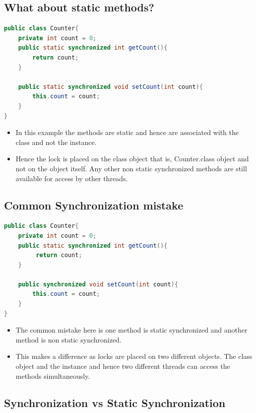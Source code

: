 \documentclass[12pt, a4paper]{book}
\begin{document}
\subsection{What about static methods?}
\begin{lstlisting}[language=java]
public class Counter{
	private int count = 0;
	public static synchronized int getCount(){
	    return count;
	}

	public static synchronized void setCount(int count){
	    this.count = count;
	}
}
\end{lstlisting}
\begin{itemize}
    \item In this example the methods are static and hence are associated with the class and not the instance.
    \item Hence the lock is placed on the class object that is, Counter.class object and not on the object itself.  Any other non static synchronized methods are still available for access by other threads.
\end{itemize}
\subsection{Common Synchronization mistake}
\begin{lstlisting}[language=java]
public class Counter{
	private int count = 0;
	public static synchronized int getCount(){
		 return count;
	}

	public synchronized void setCount(int count){
		this.count = count;
	}
}
\end{lstlisting}
\begin{itemize}
    \item The common mistake here is one method is static synchronized and another method is non static synchronized.
    \item This makes a difference as locks are placed on two different objects. The class object and the instance and hence two different threads can access the methods simultaneously.
\end{itemize}
\subsection{Synchronization vs Static Synchronization}
\end{document}
